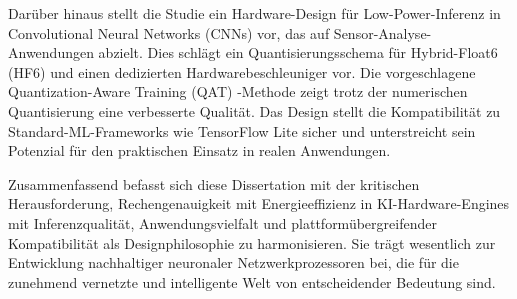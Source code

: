 \documentclass{article}
\begin{document}
	Darüber hinaus stellt die Studie ein Hardware-Design für Low-Power-Inferenz in Convolutional Neural Networks (CNNs) vor, das auf Sensor-Analyse-Anwendungen abzielt. Dies schlägt ein Quantisierungsschema für Hybrid-Float6 (HF6) und einen dedizierten Hardwarebeschleuniger vor. Die vorgeschlagene Quantization-Aware Training (QAT) -Methode zeigt trotz der numerischen Quantisierung eine verbesserte Qualität. Das Design stellt die Kompatibilität zu Standard-ML-Frameworks wie TensorFlow Lite sicher und unterstreicht sein Potenzial für den praktischen Einsatz in realen Anwendungen.
	
	Zusammenfassend befasst sich diese Dissertation mit der kritischen Herausforderung, Rechengenauigkeit mit Energieeffizienz in KI-Hardware-Engines mit Inferenzqualität, Anwendungsvielfalt und plattformübergreifender Kompatibilität als Designphilosophie zu harmonisieren. Sie trägt wesentlich zur Entwicklung nachhaltiger neuronaler Netzwerkprozessoren bei, die für die zunehmend vernetzte und intelligente Welt von entscheidender Bedeutung sind.
\end{document}
